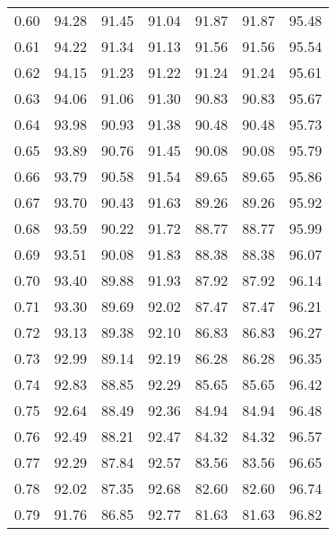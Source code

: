 \begin{tabular}{|c|c|c|c|c|c|c|}
      0.60 &     94.28 &     91.45 &      91.04 &   91.87 &      91.87 &         95.48 \\
      0.61 &     94.22 &     91.34 &      91.13 &   91.56 &      91.56 &         95.54 \\
      0.62 &     94.15 &     91.23 &      91.22 &   91.24 &      91.24 &         95.61 \\
      0.63 &     94.06 &     91.06 &      91.30 &   90.83 &      90.83 &         95.67 \\
      0.64 &     93.98 &     90.93 &      91.38 &   90.48 &      90.48 &         95.73 \\
      0.65 &     93.89 &     90.76 &      91.45 &   90.08 &      90.08 &         95.79 \\
      0.66 &     93.79 &     90.58 &      91.54 &   89.65 &      89.65 &         95.86 \\
      0.67 &     93.70 &     90.43 &      91.63 &   89.26 &      89.26 &         95.92 \\
      0.68 &     93.59 &     90.22 &      91.72 &   88.77 &      88.77 &         95.99 \\
      0.69 &     93.51 &     90.08 &      91.83 &   88.38 &      88.38 &         96.07 \\
      0.70 &     93.40 &     89.88 &      91.93 &   87.92 &      87.92 &         96.14 \\
      0.71 &     93.30 &     89.69 &      92.02 &   87.47 &      87.47 &         96.21 \\
      0.72 &     93.13 &     89.38 &      92.10 &   86.83 &      86.83 &         96.27 \\
      0.73 &     92.99 &     89.14 &      92.19 &   86.28 &      86.28 &         96.35 \\
      0.74 &     92.83 &     88.85 &      92.29 &   85.65 &      85.65 &         96.42 \\
      0.75 &     92.64 &     88.49 &      92.36 &   84.94 &      84.94 &         96.48 \\
      0.76 &     92.49 &     88.21 &      92.47 &   84.32 &      84.32 &         96.57 \\
      0.77 &     92.29 &     87.84 &      92.57 &   83.56 &      83.56 &         96.65 \\
      0.78 &     92.02 &     87.35 &      92.68 &   82.60 &      82.60 &         96.74 \\
      0.79 &     91.76 &     86.85 &      92.77 &   81.63 &      81.63 &         96.82 \\

\end{tabular}
